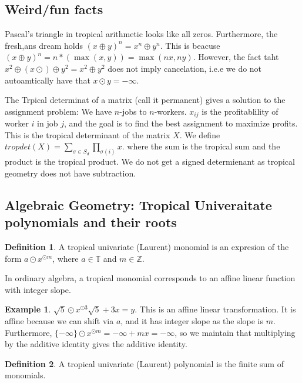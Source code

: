 \documentclass[12pt]{memoir}
\theoremstyle{definition}
\newtheorem{protoexample}{Example}[section]
\newenvironment{ex}
   {\begin{protoexample}}
   {\end{protoexample}}
\newtheorem{protodefinition}{Definition}[section]
\newenvironment{define}
   {\begin{protodefinition}}
   {\end{protodefinition}}
\def\ZZ{{\mathbb Z}}
\def\TT{{\mathbb T}}
\begin{document}
\subsection{Weird/fun facts}


Pascal's triangle in tropical arithmetic looks like all zeros. Furthermore, the fresh,ans dream holds $(x\oplus y)^n = x^n \oplus y^n$. This is beacuse $(x \oplus y)^n = n *(\max(x,y)) = \max(nx,ny)$. However, the fact taht $x^2 \oplus (x \odot ) \oplus y^2 = x^2 \oplus y^2$ does not imply cancelation, i.e.e we do not autoamtically have that $x \odot y = -\infty$.


The Trpical determinat of a matrix (call it permanent) gives a solution to the assignment problem: We have $n$-jobs to $n$-workers. $x_{ij}$ is the profitablility of worker $i$ in job $j$, and the goal is to find the best assignment to maximize profits. This is the tropical determinant of the matrix $X$. We define $tropdet(X) = \sum_{\sigma \in S_d}  \prod_{\sigma(i)}x$. where the sum is the tropical sum and the product is the tropical product. We do not get a signed determienant as tropical geometry does not have subtraction.




\subsection{Algebraic Geometry: Tropical Univeraitate polynomials and their roots}

\begin{define}
    A tropical univariate (Laurent) monomial is an expresion of the form $a \odot x^{\odot m}$, where $a \in \TT$ and $m \in \ZZ$.
\end{define}

In ordinary algebra, a tropical monomial corresponds to an affine linear function with integer slope.

\begin{ex}
    $\sqrt{5}\odot x^{\odot 3} \sqrt{5} + 3x = y$. This is an affine linear transformation. It is affine because we can shift via $a$, and it has integer slope as the slope is $m$. Furthermore, $\{-\infty\}\odot x^{\odot m} = -\infty + mx = - \infty$, so we maintain that multiplying by the additive identity gives the additive identity.
\end{ex}


\begin{define}
    A tropical univariate (Laurent) polynomial is the finite sum of monomials.
\end{define}
\end{document}
